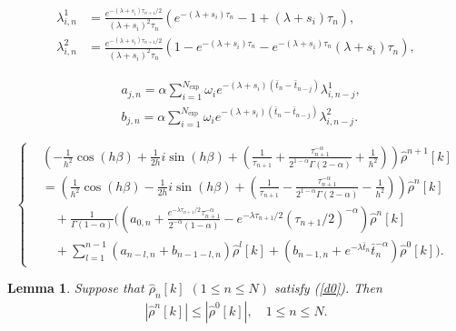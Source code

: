 \documentclass[10pt,a4paper]{amsart}
\newtheorem{lemma}{Lemma}
\begin{document}
\begin{equation}\label{lambda}
    \begin{aligned}
        \lambda_{i, n}^1
        &=\frac{e^{-(\lambda+s_i){\tau_{n+1}}/{2}}}{(\lambda+s_i)^2\tau_{n}}(e^{-(\lambda+s_i) \tau_{n}}-1+(\lambda+s_i) \tau_{n}), \\
        \lambda_{i, n}^{2}
        &=\frac{e^{-(\lambda+s_i){\tau_{n+1}}/{2}}}{(\lambda+s_i)^2\tau_{n}}(1-e^{-(\lambda+s_i) \tau_{n}}-e^{-(\lambda+s_i) \tau_{n}}(\lambda+s_i) \tau_{n}),
    \end{aligned}
\end{equation}

\begin{equation}\label{ab}
\begin{aligned}
&a_{j,  n}=\alpha \sum_{i=1}^{N_{\exp }} \omega_i e^{-(\lambda+s_i)(\bar{t}_n-\bar{t}_{n-j})} \lambda_{i,  n-j}^1,  \\
&b_{j,  n}=\alpha \sum_{i=1}^{N_{\exp }} \omega_i e^{-(\lambda+s_i)(\bar{t}_n-\bar{t}_{n-j})} \lambda_{i,  n-j}^2. 
\end{aligned}
\end{equation}

\begin{equation}\label{d0}
\left\{
\begin{aligned}
    &(-\frac{1}{h^2}\cos(h\beta)+\frac{1}{2h}i\sin(h\beta)+(\frac{1}{\tau_{n+1}}+\frac{\tau_{n+1}^{-\alpha}}{2^{1-\alpha}\Gamma(2-\alpha)}+\frac{1}{h^2}) )\hat{\rho}^{n+1}[k] \\
    &=(\frac{1}{h^2}\cos(h\beta)-\frac{1}{2h}i\sin(h\beta)+(\frac{1}{\tau_{n+1}}-\frac{\tau_{n+1}^{-\alpha}}{2^{1-\alpha}\Gamma(2-\alpha)}-\frac{1}{h^2}) )\hat{\rho}^{n}[k] \\
    &\quad +\frac{1}{\Gamma(1-\alpha)}((a_{0, n} +\frac{e^{-\lambda {\tau_{n+1}}/{2}}\tau_{n+1}^{-\alpha}}{2^{-\alpha}(1-\alpha)}-e^{-\lambda {\tau_{n+1}}/{2}} ({\tau_{n+1}}/{2})^{-\alpha})\hat{\rho}^{n}[k]\\
    &\quad +\sum\limits_{l=1}^{n-1} (a_{n-l, n}+b_{n-1-l, n}) \hat{\rho}^{l}[k]+(b_{n-1, n}+{e^{-\lambda \bar{t}_n}}{\bar{t}_n^{-\alpha}}) \hat{\rho}^{0}[k]).
\end{aligned}
\right.
\end{equation}

\begin{lemma}\label{dnd0}
    Suppose that $\hat{\rho}_{n}[k]$ $ (1\le n\le N)$ satisfy (\ref{d0}).  Then 
    \begin{align}
    |\hat{\rho}^{n}[k]|\leq |\hat{\rho}^{0}[k]|,\quad 1\le n\le N.\label{rho1}
    \end{align}
\end{lemma}
\end{document}
